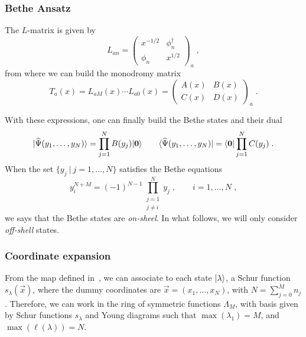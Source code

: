 \documentclass[a4paper,11pt]{amsart}
\begin{document}
\subsubsection{Bethe Ansatz}
The \(L\)-matrix is given by 
\begin{equation}
  L_{an} = 
\begin{pmatrix}
x^{ - 1/2} & \phi_n^\dagger \\ \phi_n & x^{1/2}
\end{pmatrix}_a\; , 
\end{equation}
from where we can build the monodromy matrix 
\begin{equation}
  T_a(x) = L_{aM}(x) \cdots L_{a0}(x) = 
\begin{pmatrix}
A(x) & B(x) \\ C(x) & D(x)
\end{pmatrix}_a\; .
\end{equation}

With these expressions, one can finally build the Bethe states and their dual 
\begin{equation}
  \lvert\widehat{\Psi}(y_1, \dots, y_N)\rangle = \prod_{j=1}^N B(y_j) \lvert\bm{0}\rangle\qquad 
  \langle\widehat{\Psi}(y_1, \dots, y_N)\rvert = \langle\bm{0}\rvert\prod_{j=1}^N C(y_j) \; .
\end{equation}
When the set \(\{ y_j \ | \ j =1, \dots , N\}\) satisfies the Bethe equations 
\begin{equation}
  y^{N + M}_i = (-1)^{N-1} \prod_{\substack{j = 1 \\ j \neq i}}^N y_j\; , \qquad i = 1, \dots, N\; , 
\end{equation}
we says that the Bethe states are \emph{on-sheel}. In what follows, we will 
only consider \emph{off-shell} states. 

\subsubsection{Coordinate expansion}
From the map defined in~\cite{Wheeler:2010vmq}, we can associate to
each state \(\lvert\lambda\rangle\), a Schur function \(s_\lambda(\vec{x})\),
where the dummy coordinates are \(\vec{x} = (x_1, \dots, x_N)\), with
\(N = \sum_{j=0}^M n_j\). Therefore, we can work in the ring of
symmetric functions \(\Lambda_M\), with basis given by Schur functions
\(s_\lambda\) and Young diagrams such that \(\max(\lambda_1) = M\),
and \(\max(\ell(\lambda)) = N\).
\end{document}
